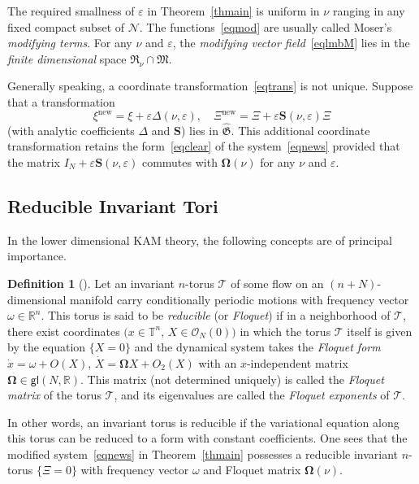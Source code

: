 \documentclass[12pt,reqno]{amsart}
\theoremstyle{definition}
\newtheorem{defn}{Definition}
\begin{document}
The required smallness of ${\varepsilon}$ in Theorem~\ref{thmain} is uniform in $\nu$
ranging in any fixed compact subset of ${\mathcal N}$. The functions~\eqref{eqmod} are
usually called Moser's \emph{modifying terms}. For any $\nu$ and ${\varepsilon}$, the
\emph{modifying vector field}~\eqref{eqlmbM} lies in the \emph{finite
dimensional} space ${\mathfrak R}_\nu\cap{\mathfrak M}$.

Generally speaking, a coordinate transformation~\eqref{eqtrans} is not unique.
Suppose that a transformation
\[
\xi{^{\text{new}}}=\xi+{\varepsilon}\Delta(\nu,{\varepsilon}), \quad \Xi{^{\text{new}}}=\Xi+{\varepsilon}{\mathbf S}(\nu,{\varepsilon})\Xi
\]
(with analytic coefficients $\Delta$ and ${\mathbf S}$) lies in ${\widehat{\mathfrak G}}$. This
additional coordinate transformation retains the form~\eqref{eqclear} of the
system~\eqref{eqnews} provided that the matrix $I_N+{\varepsilon}{\mathbf S}(\nu,{\varepsilon})$
commutes with ${\mathbf{\Omega}}(\nu)$ for any $\nu$ and ${\varepsilon}$.

\subsection{Reducible Invariant Tori}\label{reduce}

In the lower dimensional KAM theory, the following concepts are of principal
importance.

\begin{defn}[\cite{AKN06,BHS96Gro,BHS96LNM,M66,M67,S98}]\label{defFloq}
Let an invariant $n$-torus ${\mathcal T}$ of some flow on an $(n+N)$-dimensional
manifold carry conditionally periodic motions with frequency vector
$\omega\in{\mathbb R}^n$. This torus is said to be \emph{reducible} (or
\emph{Floquet}) if in a neighborhood of ${\mathcal T}$, there exist coordinates
$\bigl(x\in{\mathbb T}^n, \, X\in{\mathcal O}_N(0)\bigr)$ in which the torus ${\mathcal T}$ itself is
given by the equation $\{X=0\}$ and the dynamical system takes the
\emph{Floquet form} $\dot{x}=\omega+O(X)$, $\dot{X}={\mathbf{\Omega}} X+O_2(X)$ with an
$x$-independent matrix ${\mathbf{\Omega}}\in{\mathsf{gl}}(N,{\mathbb R})$. This matrix (not determined
uniquely) is called the \emph{Floquet matrix} of the torus ${\mathcal T}$, and its
eigenvalues are called the \emph{Floquet exponents} of ${\mathcal T}$.
\end{defn}

In other words, an invariant torus is reducible if the variational equation
along this torus can be reduced to a form with constant coefficients. One sees
that the modified system~\eqref{eqnews} in Theorem~\ref{thmain} possesses a
reducible invariant $n$-torus $\{\Xi=0\}$ with frequency vector $\omega$ and
Floquet matrix ${\mathbf{\Omega}}(\nu)$.
\end{document}
